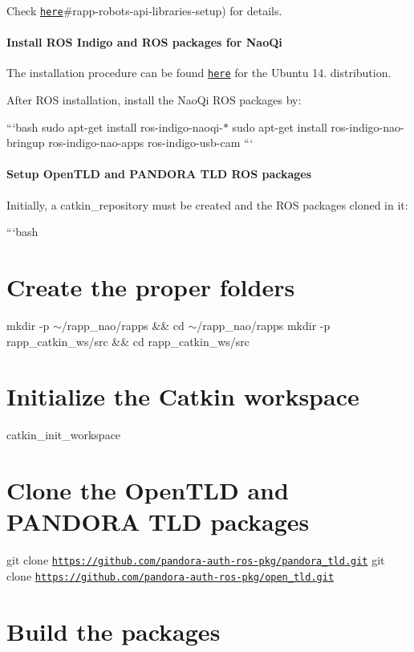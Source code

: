 Check \href{https://github.com/rapp-project/rapp-platform/wiki/Create-a-remote-robotic-application-for-NAO-in-Python-(novice}{\tt here}\#rapp-\/robots-\/api-\/libraries-\/setup) for details.

\paragraph*{Install R\-O\-S Indigo and R\-O\-S packages for Nao\-Qi}

The installation procedure can be found \href{http://wiki.ros.org/indigo/Installation/Ubuntu}{\tt here} for the Ubuntu 14. distribution.

After R\-O\-S installation, install the Nao\-Qi R\-O\-S packages by\-:

```bash sudo apt-\/get install ros-\/indigo-\/naoqi-\/$\ast$ sudo apt-\/get install ros-\/indigo-\/nao-\/bringup ros-\/indigo-\/nao-\/apps ros-\/indigo-\/usb-\/cam ```

\paragraph*{Setup Open\-T\-L\-D and P\-A\-N\-D\-O\-R\-A T\-L\-D R\-O\-S packages}

Initially, a {\ttfamily catkin\-\_\-repository} must be created and the R\-O\-S packages cloned in it\-:

```bash \section*{Create the proper folders}

mkdir -\/p $\sim$/rapp\-\_\-nao/rapps \&\& cd $\sim$/rapp\-\_\-nao/rapps mkdir -\/p rapp\-\_\-catkin\-\_\-ws/src \&\& cd rapp\-\_\-catkin\-\_\-ws/src \section*{Initialize the Catkin workspace}

catkin\-\_\-init\-\_\-workspace \section*{Clone the Open\-T\-L\-D and P\-A\-N\-D\-O\-R\-A T\-L\-D packages}

git clone \href{https://github.com/pandora-auth-ros-pkg/pandora_tld.git}{\tt https\-://github.\-com/pandora-\/auth-\/ros-\/pkg/pandora\-\_\-tld.\-git} git clone \href{https://github.com/pandora-auth-ros-pkg/open_tld.git}{\tt https\-://github.\-com/pandora-\/auth-\/ros-\/pkg/open\-\_\-tld.\-git} \section*{Build the packages}


